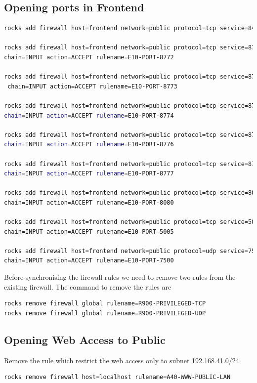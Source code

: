 \subsection{Opening ports in Frontend}
\begin{lstlisting}[language=bash]
rocks add firewall host=frontend network=public protocol=tcp service=8443 \ chain=INPUT action=ACCEPT rulename=E10-PORT-8443

rocks add firewall host=frontend network=public protocol=tcp service=8772 \
chain=INPUT action=ACCEPT rulename=E10-PORT-8772

rocks add firewall host=frontend network=public protocol=tcp service=8773 \
 chain=INPUT action=ACCEPT rulename=E10-PORT-8773

rocks add firewall host=frontend network=public protocol=tcp service=8774 \ 
chain=INPUT action=ACCEPT rulename=E10-PORT-8774

rocks add firewall host=frontend network=public protocol=tcp service=8776 \ 
chain=INPUT action=ACCEPT rulename=E10-PORT-8776

rocks add firewall host=frontend network=public protocol=tcp service=8777 \ 
chain=INPUT action=ACCEPT rulename=E10-PORT-8777

rocks add firewall host=frontend network=public protocol=tcp service=8080 \
chain=INPUT action=ACCEPT rulename=E10-PORT-8080

rocks add firewall host=frontend network=public protocol=tcp service=5005 \
chain=INPUT action=ACCEPT rulename=E10-PORT-5005

rocks add firewall host=frontend network=public protocol=udp service=7500 \
chain=INPUT action=ACCEPT rulename=E10-PORT-7500
\end{lstlisting}


Before synchronising the firewall rules we need to remove two rules from the existing firewall.
The command to remove the rules are 
\begin{lstlisting}[language=bash]
rocks remove firewall global rulename=R900-PRIVILEGED-TCP
rocks remove firewall global rulename=R900-PRIVILEGED-UDP
\end{lstlisting}
\subsection{Opening Web Access to Public}
Remove the rule which restrict the web access only to subnet 192.168.41.0/24
\begin{lstlisting}[language=bash]
rocks remove firewall host=localhost rulename=A40-WWW-PUBLIC-LAN
\end{lstlisting}

